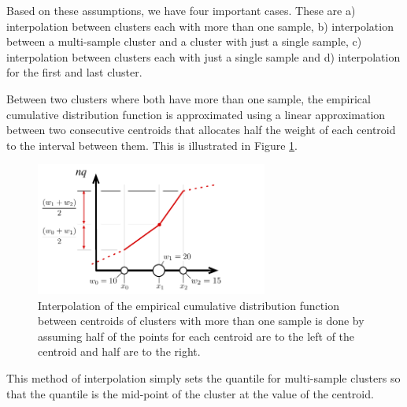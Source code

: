 \documentclass[11pt]{amsart}
\begin{document}
Based on these assumptions, we have four important cases. These are a) interpolation between clusters each with more than one sample, b) interpolation between a multi-sample cluster and a cluster with just a single sample, c) interpolation between clusters each with just a single sample and d) interpolation for the first and last cluster.

Between two clusters where both have more than one sample, the empirical cumulative distribution function is approximated using a linear approximation between two consecutive centroids that allocates half the weight of each centroid to the interval between them. This is illustrated in Figure \ref{fig:interpolation}.
\begin{figure}[htb] %
   \centering
   \includegraphics[width=3in]{quantile-figures/interpolation.pdf} 
   \caption{Interpolation of the empirical cumulative distribution function between centroids of clusters with more than one sample is done by assuming half of the points for each centroid are to the left of the centroid and half are to the right. }
   \label{fig:interpolation}
\end{figure}
This method of interpolation simply sets the quantile for multi-sample clusters so that the quantile is the mid-point of the cluster at the value of the centroid. 
\end{document}
